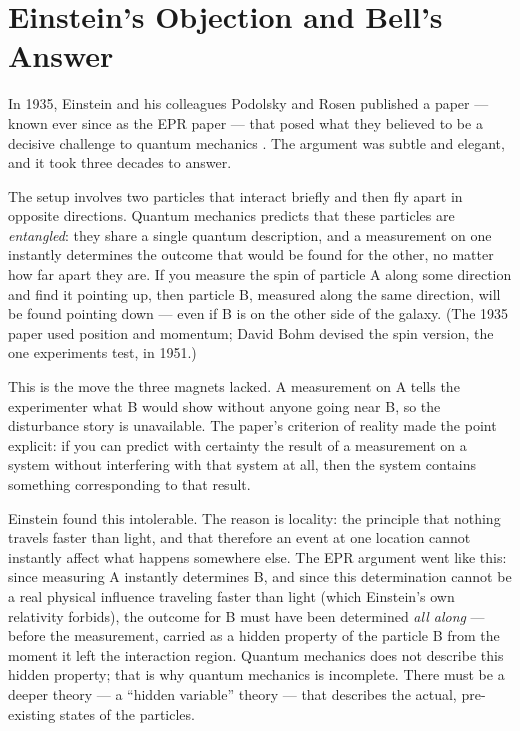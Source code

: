 \section{Einstein's Objection and Bell's Answer}
\label{sec:ch1-bell}

In 1935, Einstein and his colleagues Podolsky and Rosen published a paper --- known ever since as the EPR paper --- that posed what they believed to be a decisive challenge to quantum mechanics \citep{Einstein1935EPR}. The argument was subtle and elegant, and it took three decades to answer.

The setup involves two particles that interact briefly and then fly apart in opposite directions. Quantum mechanics predicts that these particles are \emph{entangled}: they share a single quantum description, and a measurement on one instantly determines the outcome that would be found for the other, no matter how far apart they are. If you measure the spin of particle A along some direction and find it pointing up, then particle B, measured along the same direction, will be found pointing down --- even if B is on the other side of the galaxy. (The 1935 paper used position and momentum; David Bohm devised the spin version, the one experiments test, in 1951.)

This is the move the three magnets lacked. A measurement on A tells the experimenter what B would show without anyone going near B, so the disturbance story is unavailable. The paper's criterion of reality made the point explicit: if you can predict with certainty the result of a measurement on a system without interfering with that system at all, then the system contains something corresponding to that result.

Einstein found this intolerable. The reason is locality: the principle that nothing travels faster than light, and that therefore an event at one location cannot instantly affect what happens somewhere else. The EPR argument went like this: since measuring A instantly determines B, and since this determination cannot be a real physical influence traveling faster than light (which Einstein's own relativity forbids), the outcome for B must have been determined \emph{all along} --- before the measurement, carried as a hidden property of the particle B from the moment it left the interaction region. Quantum mechanics does not describe this hidden property; that is why quantum mechanics is incomplete. There must be a deeper theory --- a ``hidden variable'' theory --- that describes the actual, pre-existing states of the particles.

